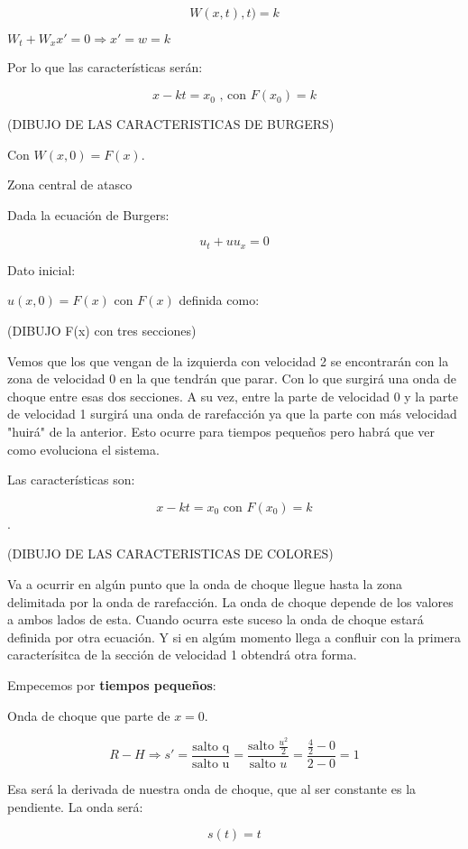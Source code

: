 			$$W(x,t),t) = k$$

			$W_t + W_x x' = 0 \Rightarrow x' = w = k$

			Por lo que las características serán:

			$$x-kt = x_0 \text{ , con }F(x_0) = k$$

			(DIBUJO DE LAS CARACTERISTICAS DE BURGERS)

			Con $W(x,0) = F(x)$.

		\begin{example}{Zona central de atasco}

			Dada la ecuación de Burgers:

			$$u_t + u u_x = 0$$

			Dato inicial:

			$u(x,0) = F(x)$ con $F(x)$ definida como:

			(DIBUJO F(x) con tres secciones)


			Vemos que los que vengan de la izquierda con velocidad 2 se encontrarán con la zona de velocidad 0 en la que tendrán que parar. Con lo que surgirá una onda de choque entre esas dos secciones. A su vez, entre la parte de velocidad 0 y la parte de velocidad 1 surgirá una onda de rarefacción ya que la parte con más velocidad "huirá" de la anterior. Esto ocurre para tiempos pequeños pero habrá que ver como evoluciona el sistema.

			Las características son:

			$$x - kt = x_0 \text{ con } F(x_0) = k$$.

			(DIBUJO DE LAS CARACTERISTICAS DE COLORES)

			Va a ocurrir en algún punto que la onda de choque llegue hasta la zona delimitada por la onda de rarefacción. La onda de choque depende de los valores a ambos lados de esta. Cuando ocurra este suceso la onda de choque estará definida por otra ecuación. Y si en algúm momento llega a confluir con la primera caracterísitca de la sección de velocidad 1 obtendrá otra forma.


			Empecemos por \textbf{tiempos pequeños}:

			Onda de choque que parte de $x=0$.

			$$R-H \Rightarrow s' = \frac{\text{salto q}}{\text{salto u}} = \frac{\text{salto }\frac{u^2}{2}}{\text{salto }u} = \frac{\frac{4}{2} - 0}{2-0} = 1 $$

			Esa será la derivada de nuestra onda de choque, que al ser constante es la pendiente. La onda será:

			$$s(t) = t$$


\end{example}
